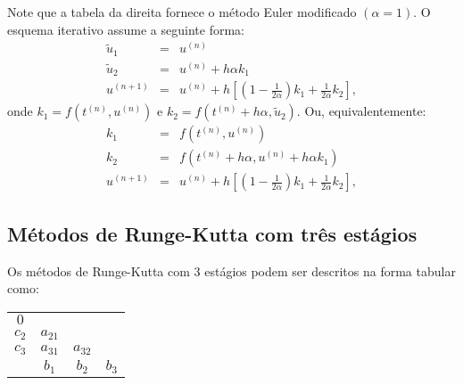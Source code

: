 Note que a tabela da direita fornece o método Euler modificado $\left(\alpha=1\right)$. O esquema iterativo assume a seguinte forma:
\begin{eqnarray}
  \tilde{u}_1 &=&u^{(n)} \\
  \tilde{u}_2 &=&u^{(n)}  +  h\alpha k_1 \\
  u^{(n+1)}&=&u^{(n)}  + h \left[ \left(1-\frac{1}{2\alpha}\right)k_1+\frac{1}{2\alpha} k_2\right],
\end{eqnarray}
onde $k_1=f(t^{(n)},u^{(n)})$ e $k_2=f(t^{(n)}+h\alpha,\tilde{u}_2)$. Ou, equivalentemente:
\begin{eqnarray}
k_1&=&f(t^{(n)},u^{(n)})\\
k_2&=&f(t^{(n)}+h\alpha,u^{(n)}  +  h\alpha k_1)\\
  u^{(n+1)}&=&u^{(n)}  + h \left[\left (1-\frac{1}{2\alpha}\right)k_1+\frac{1}{2\alpha} k_2\right],
\end{eqnarray}


\subsection{Métodos de Runge-Kutta com três estágios}\label{sec:RK_3_subsec}
Os métodos de Runge-Kutta com 3 estágios podem ser descritos na forma tabular como:
\begin{center}
\begin{tabular}{c|ccc}
  $0$              &          &               & \\
  $c_2$            & $a_{21}$ &               & \\
  $c_3$            & $a_{31}$ & $a_{32}$      & \\  \hline
                   & $b_{1}$  & $b_{2}$       & $b_{3}$
\end{tabular}
\end{center}


